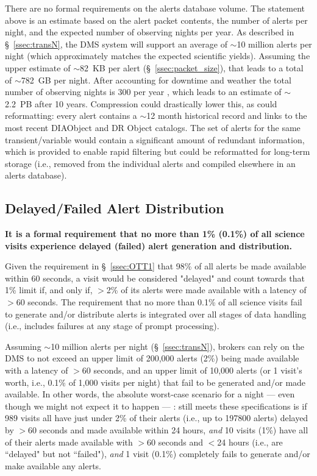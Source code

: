 \documentclass[DM,lsstdraft,authoryear,toc]{lsstdoc}
\begin{document}
There are no formal requirements on the alerts database volume. The statement above is an estimate based on the alert packet contents, the number of alerts per night, and the expected number of observing nights per year. As described in \S~\ref{ssec:transN}, the DMS system will support an average of $\sim$10 million alerts per night (which approximately matches the expected scientific yields). Assuming the upper estimate of $\sim$82~KB per alert (\S~\ref{ssec:packet_size}), that leads to a total of $\sim$782~GB per night. After accounting for downtime and weather the total number of observing nights is 300 per year , which leads to an estimate of $\sim$2.2~PB after 10 years. Compression could drastically lower this, as could reformatting: every alert contains a $\sim$12 month historical record and links to the most recent DIAObject and DR Object catalogs. The set of alerts for the same transient/variable would contain a significant amount of redundant information, which is provided to enable rapid filtering but could be reformatted for long-term storage (i.e., removed from the individual alerts and compiled elsewhere in an alerts database). 


\subsection{Delayed/Failed Alert Distribution}\label{ssec:OTR1}

{\bf It is a formal requirement that no more than 1\% (0.1\%) of all science visits experience delayed (failed) alert generation and distribution.}

Given the requirement in \S~\ref{ssec:OTT1} that 98\% of all alerts be made available within 60 seconds, a visit would be considered "delayed" and count towards that 1\% limit if, and only if, $>$2\% of its alerts were made available with a latency of $>$60 seconds. The requirement that no more than 0.1\% of all science visits fail to generate and/or distribute alerts is integrated over all stages of data handling (i.e., includes failures at any stage of prompt processing).

Assuming $\sim$10 million alerts per night (\S~\ref{ssec:transN}), brokers can rely on the DMS to not exceed an upper limit of 200,000 alerts (2\%) being made available with a latency of $>$60 seconds, and an upper limit of 10,000 alerts (or 1 visit's worth, i.e., 0.1\% of 1,000 visits per night) that fail to be generated and/or made available. In other words, the absolute worst-case scenario for a night --- even though we might not expect it to happen --- : still meets these specifications is if 989 visits all have just under 2\% of their alerts (i.e., up to 197800 alerts) delayed by $>$60 seconds and made available within 24 hours, {\it and} 10 visits (1\%) have all of their alerts made available with $>$60 seconds and $<$24 hours (i.e., are ``delayed" but not ``failed"), {\it and} 1 visit (0.1\%) completely fails to generate and/or make available any alerts.
\end{document}
